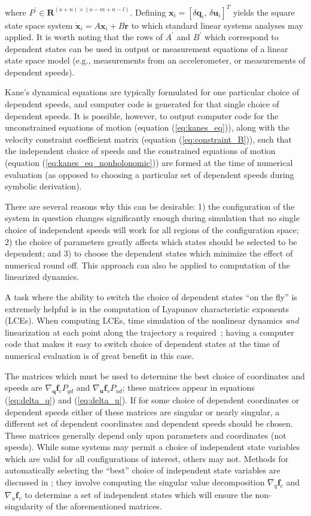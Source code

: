 \documentclass[smallcondensed,final]{svjour3}                     %
\begin{document}
where $P^\prime \in \bm{R}^{(o + n) \times (o - m + n - l)}$.  Defining
$\bm{x}_i = \left[\delta\bm{q}_i,\,\delta\bm{u}_i\right]^{T}$ yields the square
state space system $\dot{\bm{x}}_i = A \bm{x}_i + B \bm{r}$ to which standard
linear systems analyses may applied.  It is worth noting that the rows of
$A^\prime$ and $B^\prime$ which correspond to dependent states can be used in
output or measurement equations of a linear state space model (e.g.,
measurements from an accelerometer, or measurements of dependent speeds).

Kane's dynamical equations are typically formulated for one particular choice
of dependent speeds, and computer code is generated for that single choice of
dependent speeds. It is possible, however, to output computer code for the
unconstrained equations of motion (equation (\ref{eq:kanes_eq})), along with
the velocity constraint coefficient matrix (equation (\ref{eq:constraint_B})),
such that the independent choice of speeds and the constrained equations of
motion (equation (\ref{eq:kanes_eq_nonholonomic})) are formed at the time of
numerical evaluation (as opposed to choosing a particular set of dependent
speeds during symbolic derivation).

There are several reasons why this can be desirable: 1) the configuration of
the system in question changes significantly enough during simulation that no
single choice of independent speeds will work for all regions of the
configuration space; 2) the choice of parameters greatly affects which states
should be selected to be dependent; and 3) to choose the dependent states which
minimize the effect of numerical round off. This approach can also be applied
to computation of the linearized dynamics.

A task where the ability to switch the choice of dependent states ``on the
fly'' is extremely helpful is in the computation of Lyapunov characteristic
exponents (LCEs). When computing LCEs, time simulation of the nonlinear
dynamics \textit{and} linearization at each point along the trajectory a
required~\cite{Benettin1980a,Benettin1980b,Udwadia2001}; having a computer code
that makes it easy to switch choice of dependent states at the time of
numerical evaluation is of great benefit in this case.

The matrices which must be used to determine the best choice of coordinates and
speeds are $\nabla_{\bm{q}} \bm{f}_c P_{qd}$ and $\nabla_{\bm{u}} \bm{f}_v
P_{ud}$; these matrices appear in equations (\ref{eq:delta_q}) and
(\ref{eq:delta_u}).  If for some choice of dependent coordinates or dependent
speeds either of these matrices are singular or nearly singular, a different
set of dependent coordinates and dependent speeds should be chosen. These
matrices generally depend only upon parameters and coordinates (not speeds).
While some systems may permit a choice of independent state variables which are
valid for all configurations of interest, others may not. Methods for
automatically selecting the ``best'' choice of independent state variables are
discussed in \cite{Reckdahl1996}; they involve computing the singular value
decomposition $\nabla_q \bm{f}_c$ and $\nabla_u \bm{f}_v$  to determine a set
of independent states which will ensure the non-singularity of the
aforementioned matrices.
\end{document}
